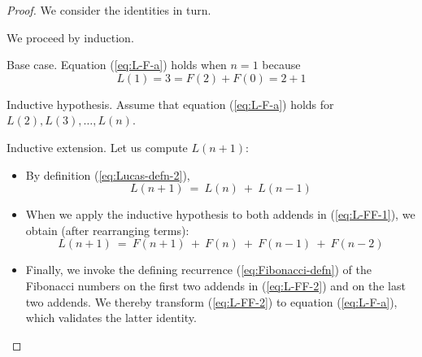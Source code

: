 \begin{proof}
We consider the identities in turn.

We proceed by induction.

\medskip

\noindent
{\sf Base case.}
Equation (\ref{eq:L-F-a}) holds when $n=1$ because
\[ L(1) = 3 = F(2) + F(0) = 2+1 \]

\medskip

\noindent
{\sf Inductive hypothesis}.
Assume that equation (\ref{eq:L-F-a}) holds for $L(2), L(3), \ldots, L(n)$.

\medskip

\noindent
{\sf Inductive extension}. 
Let us compute $L(n+1)$:
\begin{itemize}
\item
By definition (\ref{eq:Lucas-defn-2}),
\begin{equation}
\label{eq:L-FF-1}
L(n+1) \ = \ L(n) \ + \ L(n-1)
\end{equation}
\item
When we apply the inductive hypothesis to both addends in (\ref{eq:L-FF-1}), we obtain (after rearranging terms):
\begin{equation}
\label{eq:L-FF-2}
L(n+1) \ = \  F(n+1) \ + \ F(n) \ + \ F(n-1) \ + \ F(n-2)
\end{equation}
\item
Finally, we invoke the defining recurrence (\ref{eq:Fibonacci-defn}) of the Fibonacci numbers on the first two addends in (\ref{eq:L-FF-2}) and on the last two addends.  We thereby transform (\ref{eq:L-FF-2}) to equation (\ref{eq:L-F-a}), which validates the latter identity.
\end{itemize}

\bigskip

\noindent {}
\bigskip


\end{proof}
